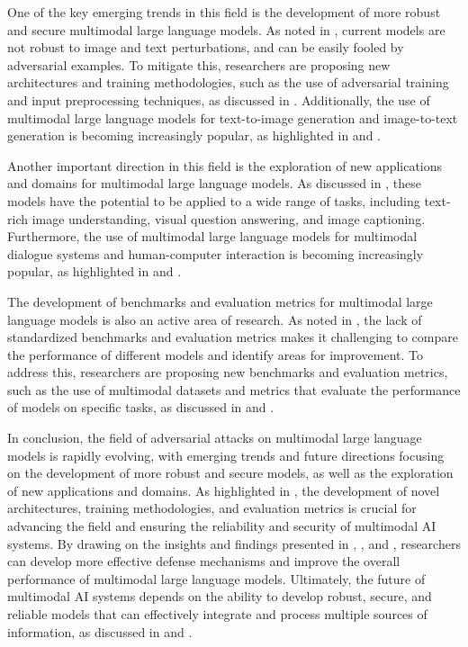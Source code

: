 \documentclass[11pt,a4paper]{article}
\begin{document}
One of the key emerging trends in this field is the development of more robust and secure multimodal large language models. As noted in \cite{arxiv:2212.08044}, current models are not robust to image and text perturbations, and can be easily fooled by adversarial examples. To mitigate this, researchers are proposing new architectures and training methodologies, such as the use of adversarial training and input preprocessing techniques, as discussed in \cite{arxiv:2403.02677}. Additionally, the use of multimodal large language models for text-to-image generation and image-to-text generation is becoming increasingly popular, as highlighted in \cite{arxiv:2305.17216} and \cite{arxiv:2406.08394}.

Another important direction in this field is the exploration of new applications and domains for multimodal large language models. As discussed in \cite{arxiv:2502.16586}, these models have the potential to be applied to a wide range of tasks, including text-rich image understanding, visual question answering, and image captioning. Furthermore, the use of multimodal large language models for multimodal dialogue systems and human-computer interaction is becoming increasingly popular, as highlighted in \cite{arxiv:2306.09093} and \cite{arxiv:2402.14154}.

The development of benchmarks and evaluation metrics for multimodal large language models is also an active area of research. As noted in \cite{arxiv:2408.08632}, the lack of standardized benchmarks and evaluation metrics makes it challenging to compare the performance of different models and identify areas for improvement. To address this, researchers are proposing new benchmarks and evaluation metrics, such as the use of multimodal datasets and metrics that evaluate the performance of models on specific tasks, as discussed in \cite{arxiv:2407.15272} and \cite{arxiv:2405.07229}.

In conclusion, the field of adversarial attacks on multimodal large language models is rapidly evolving, with emerging trends and future directions focusing on the development of more robust and secure models, as well as the exploration of new applications and domains. As highlighted in \cite{arxiv:2409.18991}, the development of novel architectures, training methodologies, and evaluation metrics is crucial for advancing the field and ensuring the reliability and security of multimodal AI systems. By drawing on the insights and findings presented in \cite{doi:10.1109/bigdata59044.2023.10386743}, \cite{arxiv:2401.13601}, and \cite{arxiv:2408.15769}, researchers can develop more effective defense mechanisms and improve the overall performance of multimodal large language models. Ultimately, the future of multimodal AI systems depends on the ability to develop robust, secure, and reliable models that can effectively integrate and process multiple sources of information, as discussed in \cite{arxiv:2309.11499} and \cite{arxiv:2405.14129}.
\end{document}
